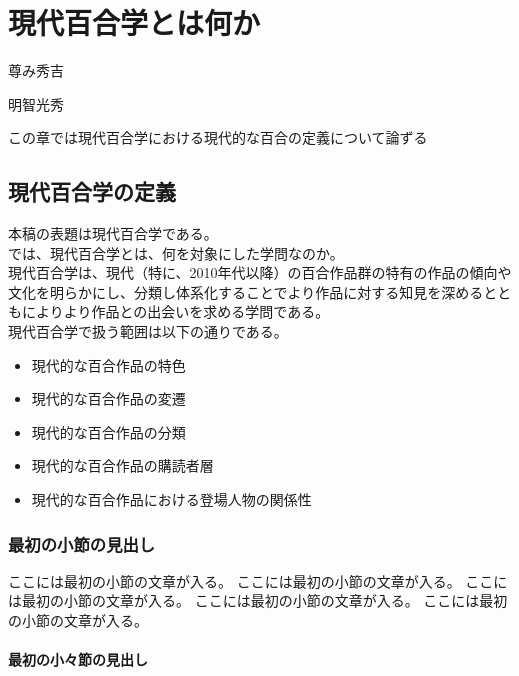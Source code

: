 \documentclass[ %
	uplatex,%
	a5paper,%
	papersize%
	]{jsbook}
\begin{document}
	\tableofcontents %

	\mainmatter

	\chapter{現代百合学とは何か}

	\epigraph{尊み秀吉}{明智光秀}

	\begin{summary}
		この章では現代百合学における現代的な百合の定義について論ずる
	\end{summary}

	\section{現代百合学の定義}
	本稿の表題は現代百合学である。\\
	では、現代百合学とは、何を対象にした学問なのか。\\
	
	現代百合学は、現代（特に、2010年代以降）の百合作品群の特有の作品の傾向や文化を明らかにし、分類し体系化することでより作品に対する知見を深めるとともによりより作品との出会いを求める学問である。\\
	
	\newpage
	現代百合学で扱う範囲は以下の通りである。

	\begin{itemize}
		\item 現代的な百合作品の特色
		\item 現代的な百合作品の変遷
		\item 現代的な百合作品の分類
		\item 現代的な百合作品の購読者層
		\item 現代的な百合作品における登場人物の関係性
	\end{itemize}

	\subsection{最初の小節の見出し}

	ここには最初の小節の文章が入る。
	ここには最初の小節の文章が入る。
	ここには最初の小節の文章が入る。
	ここには最初の小節の文章が入る。
	ここには最初の小節の文章が入る。

	\subsubsection{最初の小々節の見出し}
\end{document}
